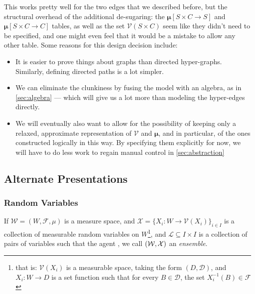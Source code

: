 \documentclass{article}
\newcommand\bmu{\boldsymbol{\mu}}
\begin{document}
	This works pretty well for the two edges that we described before, but the structural overhead of the additional de-sugaring: the $\boldsymbol\mu[S\times C\to S]$ and $\boldsymbol\mu[S\times C\to C]$ tables, as well as the set $\mathcal V(S \times C)$ seem like they didn't need to be specified, and one might even feel that it would be a mistake to allow any other table. Some reasons for this design decision include:
	\begin{itemize}[nosep]
		\item It is easier to prove things about graphs than directed hyper-graphs. Similarly, defining directed paths is a lot simpler.
		\item We can eliminate the clunkiness by fusing the model with an algebra, as in \cref{sec:algebra} --- which will give us a lot more than modeling the hyper-edges directly.
		\item We will eventually also want to allow for the possibility of keeping only a relaxed, approximate representation of $\mathcal V$ and $\bmu$, and in particular, of the ones constructed logically in this way. By specifying them explicitly for now, we will have to do less work to regain manual control in \cref{sec:abstraction}
	\end{itemize}

	\subsection{Alternate Presentations}
	\subsubsection{Random Variables}
	If $\mathcal W = (W, \mathcal F, \mu)$ is a measure space, and $\mathcal X = \{ X_i: W \to \mathcal V(X_i) \}_{i \in I} $ is a collection of measurable random variables on $W$\footnote{that is: $\mathcal V(X_i)$ is a measurable space, taking the form $(D, \mathcal D)$, and $X_i : W \to D$ is a set function such that for every $B \in \mathcal D$, the set $X_i^{-1}(B) \in \mathcal F$}, and 
	{\color{gray}$\mathcal L \subseteq I \times I$ is a collection of pairs of variables such that the agent } 
	, we call $(\cal W, X)$ an \emph{ensemble}.
	
\end{document}
